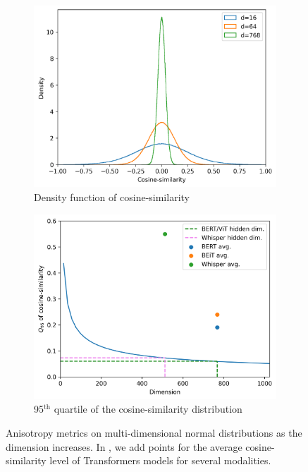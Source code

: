 \begin{figure}[ht]
     \centering
     \begin{subfigure}[b]{0.43\textwidth}
          \includegraphics[width=\linewidth]{sources/part_1/anisotropy/imgs/cosine_v_density.png}
          \caption{Density function of cosine-similarity}
          \label{fig:cosine_v_density}
     \end{subfigure}
     \hfill
     \begin{subfigure}[b]{0.43\textwidth}
          \includegraphics[width=\linewidth]{sources/part_1/anisotropy/imgs/q95_dimension.png}
          \caption{95$^{\text{th}}$\! quartile of the cosine-similarity distribution}
          \label{fig:q95}
     \end{subfigure}
     \caption{Anisotropy metrics on multi-dimensional normal distributions as the dimension increases. In , we add points for the average cosine-similarity level of Transformers models for several modalities.}
     \label{fig:anisotropy_modalities}
 \end{figure}


